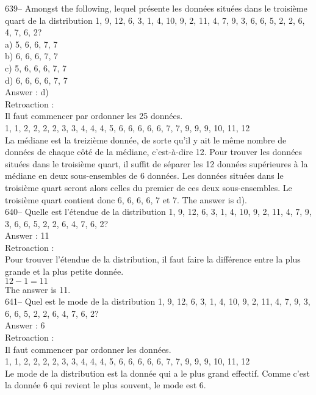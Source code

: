 ﻿\documentclass[letterpaper, 12pt]{article}
\begin{document}
639-- Amongst the following, lequel pr\'esente les donn\'ees
situ\'ees dans le troisi\`eme quart de la distribution 1, 9, 12, 6, 3, 1, 4,
10, 9, 2, 11, 4, 7, 9, 3, 6, 6, 5, 2, 2, 6, 4, 7, 6, 2?\\
a) 5, 6, 6, 7, 7\\
b) 6, 6, 6, 7, 7\\
c) 5, 6, 6, 6, 7, 7\\
d) 6, 6, 6, 6, 7, 7\\

Answer : d)\\

Retroaction : \\
Il faut commencer par ordonner les 25 donn\'ees.\\
1, 1, 2, 2, 2, 2, 3, 3, 4, 4, 4, 5, 6, 6, 6, 6, 6, 7, 7, 9, 9, 9, 10, 11,
12\\
La m\'ediane est la treizi\`eme donn\'ee, de sorte qu'il y ait le m\^eme
nombre de donn\'ees de chaque c\^ot\'e de la m\'ediane, c'est-\`a-dire 12.
Pour trouver les donn\'ees situ\'ees dans le troisi\`eme quart, il suffit de
s\'eparer les 12 donn\'ees sup\'erieures \`a la m\'ediane en deux
sous-ensembles de 6 donn\'ees.  Les donn\'ees situ\'ees dans le troisi\`eme
quart seront alors celles du premier de ces deux sous-ensembles.  Le
troisi\`eme quart contient donc 6, 6, 6, 6, 7 et 7.  The answer is d). \\

640-- Quelle est l'\'etendue de la distribution 1, 9, 12, 6, 3, 1, 4, 10, 9,
2, 11, 4, 7, 9, 3, 6, 6, 5, 2, 2, 6, 4, 7, 6, 2?\\

Answer : 11\\

Retroaction : \\
Pour trouver l'\'etendue de la distribution, il faut faire la diff\'erence
entre la plus grande et la plus petite donn\'ee.  \\
$12-1=11$\\
The answer is 11.\\

641-- Quel est le mode de la distribution 1, 9, 12, 6, 3, 1, 4, 10, 9, 2,
11, 4, 7, 9, 3, 6, 6, 5, 2, 2, 6, 4, 7, 6, 2?\\

Answer : 6\\

Retroaction : \\
Il faut commencer par ordonner les donn\'ees.\\
1, 1, 2, 2, 2, 2, 3, 3, 4, 4, 4, 5, 6, 6, 6, 6, 6, 7, 7, 9, 9, 9, 10, 11,
12\\
Le mode de la distribution est la donn\'ee qui a le plus grand effectif.
Comme c'est la donn\'ee 6 qui revient le plus souvent, le mode est 6.\\
\end{document}
